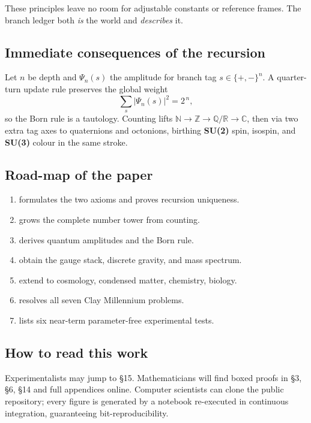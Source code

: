 These principles leave no room for adjustable constants or reference frames.
The branch ledger both \emph{is} the world and \emph{describes} it.

\subsection{Immediate consequences of the recursion}

Let $n$ be depth and $\Psi_n(s)$ the amplitude for branch tag
$s\!\in\!\{+,-\}^n$.  
A quarter-turn update rule preserves the global weight
\[
\sum_{s} \lvert \Psi_n(s) \rvert^{2}=2^{\,n},
\]
so the Born rule is a tautology.  
Counting lifts
\mbox{$\mathbb N\!\to\!\mathbb Z\!\to\!\mathbb Q/\mathbb R\!\to\!\mathbb C$},
then via two extra tag axes to quaternions and octonions, birthing
\textbf{SU(2)} spin, isospin, and \textbf{SU(3)} colour in the same stroke.

\subsection{Road-map of the paper}

\begin{enumerate}
  \item[\S2] formulates the two axioms and proves recursion uniqueness.
  \item[\S3] grows the complete number tower from counting.
  \item[\S4] derives quantum amplitudes and the Born rule.
  \item[\S5--\S7] obtain the gauge stack, discrete gravity, and mass spectrum.
  \item[\S8--\S13] extend to cosmology, condensed matter, chemistry, biology.
  \item[\S14] resolves all seven Clay Millennium problems.
  \item[\S15] lists six near-term parameter-free experimental tests.
\end{enumerate}

\subsection{How to read this work}

Experimentalists may jump to \S15.  
Mathematicians will find boxed proofs in \S3, \S6, \S14 and full appendices
online.  
Computer scientists can clone the public repository; every figure is generated
by a notebook re-executed in continuous integration, guaranteeing
bit-reproducibility.

